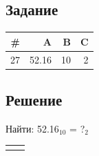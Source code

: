 \documentclass[11pt]{article}
\begin{document}
\subsection{Задание}
\label{sec:org725aef3}
\begin{center}
\begin{tabular}{|r|rrr|}
\hline
\# & A & B & C\\
\hline
27 & 52.16 & 10 & 2\\
\hline
\end{tabular}
\end{center}

\subsection{Решение}
\label{sec:orgd29cd8e}
Найти: 52.16\(_{\text{10}}\) = ?\(_{\text{2}}\)
\begin{center}
\begin{tabular}{ p{200pt} p{200pt} }
\makecell{
$\arraycolsep=0.05em
\begin{array}{rr@{\,}r|rr@{\,}r|rr@{\,}r|r@{\,}r|r@{\,}r|r}
5 & 2 &&\, 2 \\
\cline{4-5}
5 & 2 &&\, 2 & 6 &&\, 2 \\
\cline{1-2}\cline{7-8}
&\textbf{0}&&2&6 &&\, 1 & 3 &&\, 2 \\
\cline{4-5}\cline{10-10}
&&&&   \textbf{0} &&  1 & 2 &&\, 6 &&\, 2 \\
\cline{7-8}\cline{12-12}
&&&&&&&           \textbf{1} &&  6 &&\, 3 &&\, 2 \\
\cline{10-10}\cline{14-14}
&&&&&&&&&                \textbf{0}&&\, 2 &&\, \textbf{1} \\
\cline{12-12}
&&&&&&&&&&&                     \textbf{1} \\
\end{array}$} &
\makecell{
$\arraycolsep=0.05em
\begin{array}{r@{\,}r|rr}
\textbf{0} &&\, 16 \\
\cline{1-3}
\textbf{0} &&\, 32 \\
\cline{1-3}
\textbf{0} &&\, 64 \\
 \cline{1-3}
\textbf{1} &&\, 28 \\
 \cline{1-3}
\textbf{0} &&\, 56 \\
 \cline{1-3}
\textbf{1} &&\, 12 \\
\end{array}$}
\end{tabular}
\end{center}
\end{document}
